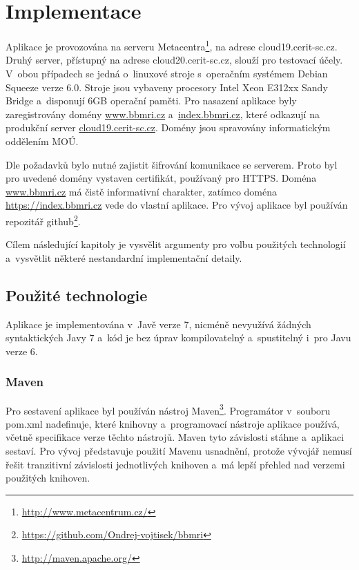 \documentclass[11pt, draft, oneside]{fithesis2}
\begin{document}
\chapter{Implementace}\label{chapter:implementation}
Aplikace je provozována na serveru Metacentra\footnote{\url{http://www.metacentrum.cz/}}, na adrese cloud19.cerit-sc.cz. Druhý server, přístupný na adrese cloud20.cerit-sc.cz, slouží pro testovací účely. V~obou případech se jedná o~linuxové stroje s~operačním systémem Debian Squeeze verze 6.0. Stroje jsou vybaveny procesory Intel Xeon E312xx Sandy Bridge a~disponují 6GB operační paměti. Pro nasazení aplikace byly zaregistrovány domény \url{www.bbmri.cz} a~\url{index.bbmri.cz}, které odkazují na produkční server \url{cloud19.cerit-sc.cz}. Domény jsou spravovány informatickým oddělením MOÚ.

Dle požadavků bylo nutné zajistit šifrování komunikace se serverem. Proto byl pro uvedené domény vystaven certifikát, používaný pro HTTPS. 
Doména \url{www.bbmri.cz} má čistě informativní charakter, zatímco doména \url{https://index.bbmri.cz} vede do vlastní aplikace.
Pro vývoj aplikace byl používán repozitář github\footnote{\url{https://github.com/Ondrej-vojtisek/bbmri}}. 

Cílem následující kapitoly je vysvělit argumenty pro volbu použitých technologií a~vysvětlit některé nestandardní implementační detaily.

\section{Použité technologie}
Aplikace je implementována v~Javě verze 7, nicméně nevyužívá žádných syntaktických  Javy 7 a~kód je bez úprav kompilovatelný a~spustitelný i~pro Javu verze 6. 

\subsection{Maven}
Pro sestavení aplikace byl používán nástroj Maven\footnote{\url{http://maven.apache.org/}}. Programátor v~souboru pom.xml nadefinuje, které knihovny a~programovací nástroje aplikace používá, včetně specifikace verze těchto nástrojů. Maven tyto závislosti stáhne a~aplikaci sestaví. Pro vývoj představuje použití Mavenu usnadnění, protože vývojář nemusí řešit tranzitivní závislosti jednotlivých knihoven a~má lepší přehled nad verzemi použitých knihoven. 
\end{document}
